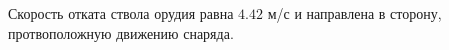 Скорость отката ствола орудия равна $4.42$ м/с и направлена в сторону, протвоположную движению снаряда.
